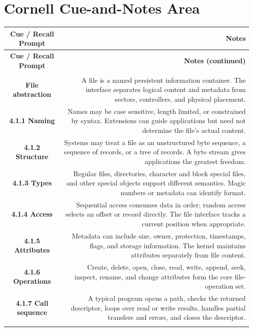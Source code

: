 \documentclass[10pt,letterpaper]{article}
\begin{document}
\section*{Cornell Cue-and-Notes Area}
\small
\begin{longtable}{C N}
\color{white}\textbf{Cue / Recall Prompt} &
\color{white}\textbf{Notes}\\
\endfirsthead
{}
\color{white}\textbf{Cue / Recall Prompt} &
\color{white}\textbf{Notes (continued)}\\
\endhead
{}\\*\hline
\textbf{File abstraction} & A file is a named persistent information container. The interface separates logical content and metadata from sectors, controllers, and physical placement.\\\hline
\textbf{4.1.1 Naming} & Names may be case sensitive, length limited, or constrained by syntax. Extensions can guide applications but need not determine the file's actual content.\\\hline
\textbf{4.1.2 Structure} & Systems may treat a file as an unstructured byte sequence, a sequence of records, or a tree of records. A byte stream gives applications the greatest freedom.\\\hline
\textbf{4.1.3 Types} & Regular files, directories, character and block special files, and other special objects support different semantics. Magic numbers or metadata can identify format.\\\hline
\textbf{4.1.4 Access} & Sequential access consumes data in order; random access selects an offset or record directly. The file interface tracks a current position when appropriate.\\\hline
\textbf{4.1.5 Attributes} & Metadata can include size, owner, protection, timestamps, flags, and storage information. The kernel maintains attributes separately from file content.\\\hline
\textbf{4.1.6 Operations} & Create, delete, open, close, read, write, append, seek, inspect, rename, and change attributes form the core file-operation set.\\\hline
\textbf{4.1.7 Call sequence} & A typical program opens a path, checks the returned descriptor, loops over read or write results, handles partial transfers and errors, and closes the descriptor.\\\hline
{}\\*\hline

\end{longtable}
\end{document}
